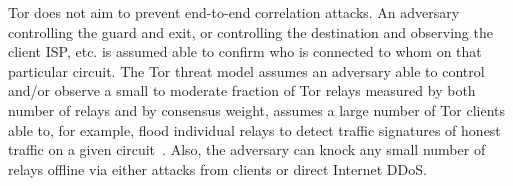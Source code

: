 Tor does not aim to prevent end-to-end correlation attacks. An adversary
controlling the guard and exit, or controlling the destination and observing the
client ISP, etc. is assumed able to confirm who is connected to whom on that
particular circuit. The Tor threat model assumes an adversary able to control
and/or observe a small to moderate fraction of Tor relays measured by both
number of relays and by consensus weight, assumes a large number of Tor clients
able to, for example, flood individual relays to detect traffic signatures of
honest traffic on a given circuit~\cite{long-paths}. Also, the adversary can
knock any small number of relays offline via either attacks from clients or
direct Internet DDoS\@. 
